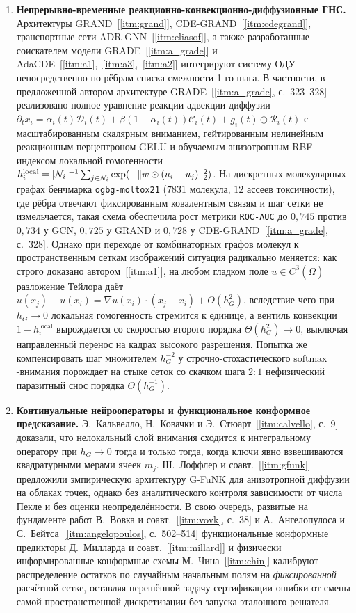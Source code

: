 \begin{enumerate}
    \item \textbf{Непрерывно-временные реакционно-конвекционно-диффузионные ГНС.} Архитектуры GRAND~[\ref{itm:grand}], CDE-GRAND~[\ref{itm:cdegrand}], транспортные сети ADR-GNN~[\ref{itm:eliasof}], а также разработанные соискателем модели GRADE~[\ref{itm:a_grade}] и AdaCDE~[\ref{itm:a1},~\ref{itm:a3},~\ref{itm:a2}] интегрируют систему ОДУ непосредственно по рёбрам списка смежности 1-го шага. В частности, в предложенной автором архитектуре GRADE~[\ref{itm:a_grade}, с.~323--328] реализовано полное уравнение реакции-адвекции-диффузии $\partial_t x_i = \alpha_i(t)\mathcal{D}_i(t) + \beta(1-\alpha_i(t))\mathcal{C}_i(t) + g_i(t)\odot\mathcal{R}_i(t)$ с масштабированным скалярным вниманием, гейтированным нелинейным реакционным перцептроном GELU и обучаемым анизотропным RBF-индексом локальной гомогенности $h_i^{\mathrm{local}}=|\mathcal{N}_i|^{-1}\sum_{j\in\mathcal{N}_i}\exp(-\|w\odot(u_i-u_j)\|_2^2)$. На дискретных молекулярных графах бенчмарка \texttt{ogbg-moltox21} ($7831$ молекула, $12$ ассеев токсичности), где рёбра отвечают фиксированным ковалентным связям и шаг сетки не измельчается, такая схема обеспечила рост метрики \texttt{ROC-AUC} до $0{,}745$ против $0{,}734$ у GCN, $0{,}725$ у GRAND и $0{,}728$ у CDE-GRAND~[\ref{itm:a_grade}, с.~328]. Однако при переходе от комбинаторных графов молекул к пространственным сеткам изображений ситуация радикально меняется: как строго доказано автором~[\ref{itm:a1}], на любом гладком поле $u\in C^3(\overline{\Omega})$ разложение Тейлора даёт $u(x_j)-u(x_i)=\nabla u(x_i)\cdot(x_j-x_i)+O(h_G^2)$, вследствие чего при $h_G\to 0$ локальная гомогенность стремится к единице, а вентиль конвекции $1-h_i^{\mathrm{local}}$ вырождается со скоростью второго порядка $\Theta(h_G^2)\to 0$, выключая направленный перенос на кадрах высокого разрешения. Попытка же компенсировать шаг множителем $h_G^{-2}$ у строчно-стохастического $\mathrm{softmax}$-внимания порождает на стыке сеток со скачком шага $2:1$ нефизический паразитный снос порядка $\Theta(h_G^{-1})$.
    \item \textbf{Континуальные нейрооператоры и функциональное конформное предсказание.} Э.~Кальвелло, Н.~Ковачки и Э.~Стюарт~[\ref{itm:calvello}, с.~9] доказали, что нелокальный слой внимания сходится к интегральному оператору при $h_G\to 0$ тогда и только тогда, когда ключи явно взвешиваются квадратурными мерами ячеек $m_j$. Ш.~Лоффлер и соавт.~[\ref{itm:gfunk}] предложили эмпирическую архитектуру G-FuNK для анизотропной диффузии на облаках точек, однако без аналитического контроля зависимости от числа Пекле и без оценки неопределённости. В свою очередь, развитые на фундаменте работ В.~Вовка и соавт.~[\ref{itm:vovk}, с.~38] и А.~Ангелопулоса и С.~Бейтса~[\ref{itm:angelopoulos}, с.~502--514] функциональные конформные предикторы Д.~Милларда и соавт.~[\ref{itm:millard}] и физически информированные конформные схемы М.~Чина~[\ref{itm:chin}] калибруют распределение остатков по случайным начальным полям на \emph{фиксированной} расчётной сетке, оставляя нерешённой задачу сертификации ошибки от смены самой пространственной дискретизации без запуска эталонного решателя.
\end{enumerate}

